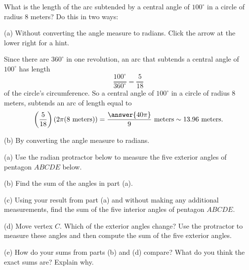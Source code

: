 \documentclass{ximera}
\begin{document}
\begin{question} \label{Q873:Radians}
What is the length of the arc subtended by a central angle of $100^\circ$ in a circle of radius $8$ meters? Do this in two ways:

(a) Without converting the angle measure to radians. Click the arrow at the lower right for a hint.

\begin{expandable}
Since there are $360^\circ$ in one revolution, an arc that subtends a central angle of $100^\circ$ has length
\[
        \frac{100^\circ}{360^\circ} = \frac{5}{18}
\]
of the circle's circumference. So a central angle of $100^\circ$ in a circle of radius $8$ meters, subtends an arc of length equal to 
\[
    \left( \frac{5}{18} \right) (2\pi (8 \text{ meters})) = \frac{\answer{40\pi}}{9} \text{ meters} \sim 13.96 \text{ meters} .
\]
\end{expandable}

(b) By converting the angle measure to radians.
\end{question}



\begin{exploration}  \label{Q111:Radians}
(a) Use the radian protractor below to measure the five exterior angles of pentagon $ABCDE$ below.

(b) Find the sum of the angles in part (a).

(c) Using your result from part (a) and without making any additional measurements, find the sum of the five interior angles of pentagon $ABCDE$.

(d) Move vertex $C$. Which of the exterior angles change? Use the protractor to measure these angles and then compute the sum of the five exterior angles.

(e) How do your sums from parts (b) and (d) compare? What do you think the exact sums are? Explain why.


 
\begin{onlineOnly}
    \begin{center}
\end{center}
\end{onlineOnly}
\end{exploration}
\end{document}

